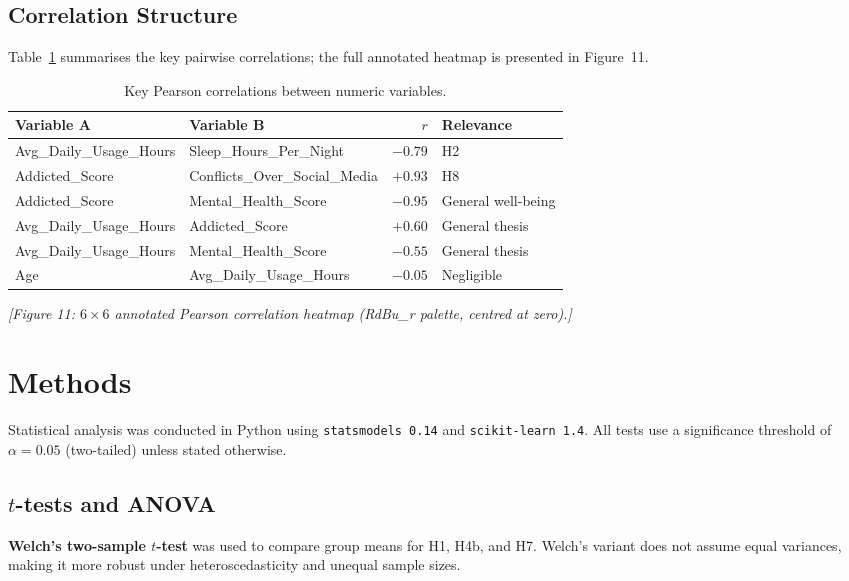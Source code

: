\documentclass[10pt]{article}
\begin{document}
\subsection{Correlation Structure}

Table~\ref{tab:corr} summarises the key pairwise correlations; the full
annotated heatmap is presented in Figure~11.

\begin{table}[H]
\centering
\caption{Key Pearson correlations between numeric variables.}
\label{tab:corr}
\small
\begin{tabular}{@{} l l r l @{}}
\toprule
\textbf{Variable A} & \textbf{Variable B} & \textbf{$r$}
  & \textbf{Relevance} \\
\midrule
Avg\_Daily\_Usage\_Hours & Sleep\_Hours\_Per\_Night & $-0.79$ & H2 \\
Addicted\_Score & Conflicts\_Over\_Social\_Media & $+0.93$ & H8 \\
Addicted\_Score & Mental\_Health\_Score & $-0.95$ & General well-being \\
Avg\_Daily\_Usage\_Hours & Addicted\_Score & $+0.60$ & General thesis \\
Avg\_Daily\_Usage\_Hours & Mental\_Health\_Score & $-0.55$ & General thesis \\
Age & Avg\_Daily\_Usage\_Hours & $-0.05$ & Negligible \\
\bottomrule
\end{tabular}
\end{table}

\textit{[Figure 11: $6\times6$ annotated Pearson correlation heatmap
(RdBu\_r palette, centred at zero).]}

\section{Methods}

Statistical analysis was conducted in Python using \texttt{statsmodels 0.14}
and \texttt{scikit-learn 1.4}. All tests use a significance threshold of
$\alpha = 0.05$ (two-tailed) unless stated otherwise.

\subsection{$t$-tests and ANOVA}

\textbf{Welch's two-sample $t$-test} was used to compare group means for H1,
H4b, and H7. Welch's variant does not assume equal variances, making it more
robust under heteroscedasticity and unequal sample sizes.
\end{document}
